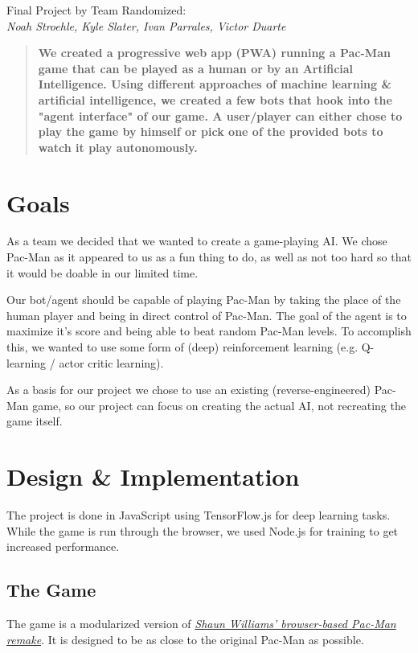 \documentclass[10pt, letterpaper]{article}
\begin{document}
    \begin{center}
        Final Project by Team Randomized:\\
        \emph{Noah Stroehle, Kyle Slater, Ivan Parrales, Victor Duarte}
    \end{center}
    
    \begin{abstract}
        \bf We created a progressive web app (PWA) running a Pac-Man game that can be played as a human or by an Artificial Intelligence. Using different approaches of machine learning \& artificial intelligence, we created a few bots that hook into the "agent interface" of our game. A user/player can either chose to play the game by himself or pick one of the provided bots to watch it play autonomously.
    \end{abstract}

    \section{Goals}
    As a team we decided that we wanted to create a game-playing AI. We chose Pac-Man as it appeared to us as a fun thing to do, as well as not too hard so that it would be doable in our limited time.
    
    Our bot/agent should be capable of playing Pac-Man by taking the place of the human player and being in direct control of Pac-Man. The goal of the agent is to maximize it's score and being able to beat random Pac-Man levels. To accomplish this, we wanted to use some form of (deep) reinforcement learning (e.g. Q-learning / actor critic learning).
    
    As a basis for our project we chose to use an existing (reverse-engineered) Pac-Man game, so our project can focus on creating the actual AI, not recreating the game itself.
    
    \section{Design \& Implementation}
        The project is done in JavaScript using TensorFlow.js for deep learning tasks. While the game is run through the browser, we used Node.js for training to get increased performance.
    
        \subsection{The Game}
            The game is a modularized version of \emph{\href{https://github.com/shaunlebron/pacman}{Shaun Williams' browser-based Pac-Man remake}}. It is designed to be as close to the original Pac-Man as possible.
            
\end{document}
